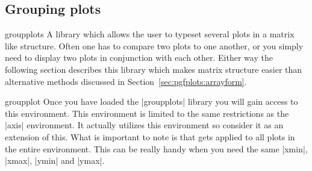\subsection{Grouping plots}
{
\label{sec:group:plot}

{}

%



\begin{pgfplotslibrary}{groupplots}
  A library which allows the user to typeset several plots in a matrix like structure.
  Often one has to compare two plots to one another, or you simply need to display two plots in conjunction with each other. Either way the following
  section describes this library which makes matrix structure easier than alternative methods discussed in Section~\ref{sec:pgfplots:arrayform}.
\end{pgfplotslibrary}

\begin{environment}{{groupplot}}
  Once you have loaded the |groupplots| library you will gain access to this environment. This environment is limited to the same restrictions as the
  |axis| environment. It actually utilizes this environment so consider it as an extension of this. What is important to note is that  gets
  applied to all plots in the entire environment. This can be really handy when you need the same |xmin|, |xmax|, |ymin| and |ymax|.
\end{environment}

}
